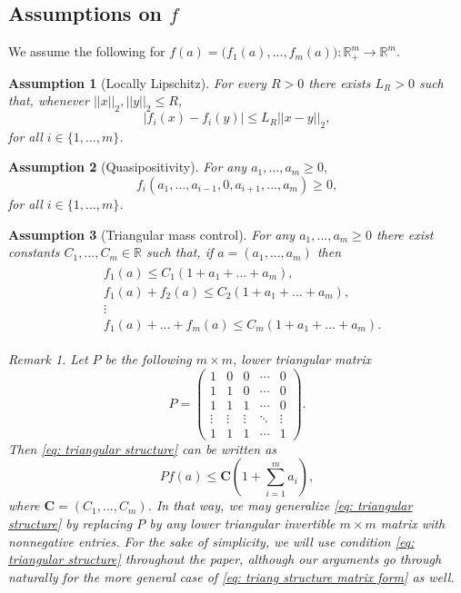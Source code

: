 \documentclass[12pt]{article}
\newtheorem{assumption}{Assumption}
\theoremstyle{definition}
\theoremstyle{remark}
\newtheorem{remark}{Remark}
\begin{document}
\subsection{Assumptions on $f$}
We assume the following for $f(a) = \bigl(f_1(a),...,f_m(a)\bigr) :\mathbb R^m_{+} \rightarrow \mathbb R^m$.
\begin{assumption}[Locally Lipschitz]\label{assump: locally Lipschitz f}
    For every $R>0$ there exists $L_R>0$ such that, whenever $||x||_2,||y||_2\leq R$,
\[
|f_i(x)-f_i(y)|\leq L_{R}||x-y||_2,
\]
for all $i\in \{1,...,m\}$.
\end{assumption}
\begin{assumption}[Quasipositivity]\label{assump: Positivity f} For any $a_1,...,a_m\geq 0,$
    \begin{equation*}
     f_i(a_1,...,a_{i-1},0,a_{i+1},...,a_m) \geq 0,
\end{equation*}
for all $i\in \{1,...,m\}$.
\end{assumption}
\begin{assumption}[Triangular mass control]\label{assump: triangular mass control f}
    For any $a_1,...,a_m\geq 0$ there exist constants $C_1,...,C_m\in \mathbb R$ such that, if $a=(a_1,...,a_m)$ then
\begin{align}\label{eq: triangular structure}
\begin{split}
    &f_{1}(a)\leq C_1(1+a_1+...+a_m),\\
    &f_1(a)+f_2(a)\leq C_2(1+a_1+...+a_m),\\
    &\vdots\\
    &f_1(a)+...+f_m(a)\leq C_m(1+a_1+...+a_m).
\end{split}
\end{align}
\begin{remark}
    Let $P$ be the following $m\times m$, lower triangular matrix
    \[
P=\begin{pmatrix}
1 & 0 & 0 & \cdots & 0 \\
1 & 1 & 0 & \cdots & 0 \\
1 & 1 & 1 & \cdots & 0 \\
\vdots & \vdots & \vdots & \ddots & \vdots \\
1 & 1 & 1 & \cdots & 1
\end{pmatrix}.
\]
Then \eqref{eq: triangular structure} can be written as
\begin{equation}\label{eq: triang structure matrix form}
Pf(a)\leq \mathbf{C}\left(1+\sum_{i=1}^m a_i\right),
\end{equation}
where $\mathbf{C} = (C_1,...,C_m)$. In that way, we may generalize \eqref{eq: triangular structure} by replacing $P$ by any lower triangular invertible $m\times m$ matrix with nonnegative entries. For the sake of simplicity, we will use condition \eqref{eq: triangular structure} throughout the paper, although our arguments go through naturally for the more general case of \eqref{eq: triang structure matrix form} as well.
\end{remark}
\end{assumption}
\end{document}
